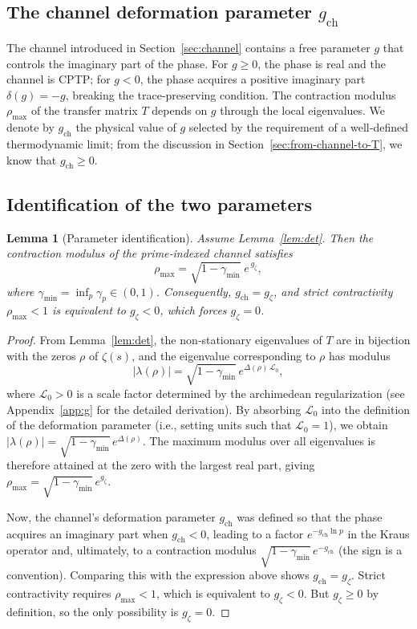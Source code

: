 \documentclass[11pt,a4paper]{article}
\newtheorem{lemma}{Lemma}
\begin{document}
\subsection{The channel deformation parameter $g_{\mathrm{ch}}$}
\label{sec:gch}

The channel introduced in Section~\ref{sec:channel} contains a free parameter $g$ that controls the imaginary part of the phase.  For $g\ge0$, the phase is real and the channel is CPTP; for $g<0$, the phase acquires a positive imaginary part $\delta(g)=-g$, breaking the trace‑preserving condition.  The contraction modulus $\rho_{\max}$ of the transfer matrix $T$ depends on $g$ through the local eigenvalues.  We denote by $g_{\mathrm{ch}}$ the physical value of $g$ selected by the requirement of a well‑defined thermodynamic limit; from the discussion in Section~\ref{sec:from-channel-to-T}, we know that $g_{\mathrm{ch}}\ge0$.

\subsection{Identification of the two parameters}
\label{sec:identification}

\begin{lemma}[Parameter identification]\label{lem:g}
Assume Lemma~\ref{lem:det}.  Then the contraction modulus of the prime‑indexed channel satisfies
\[
\rho_{\max} = \sqrt{1-\gamma_{\min}}\; e^{\,g_{\zeta}},
\]
where $\gamma_{\min} = \inf_{p} \gamma_p \in (0,1)$.  Consequently, $g_{\mathrm{ch}} = g_{\zeta}$, and strict contractivity $\rho_{\max}<1$ is equivalent to $g_{\zeta} < 0$, which forces $g_{\zeta}=0$.
\end{lemma}

\begin{proof}
From Lemma~\ref{lem:det}, the non‑stationary eigenvalues of $T$ are in bijection with the zeros $\rho$ of $\zeta(s)$, and the eigenvalue corresponding to $\rho$ has modulus
\[
|\lambda(\rho)| = \sqrt{1-\gamma_{\min}}\, e^{\Delta(\rho)\,\mathcal{L}_0},
\]
where $\mathcal{L}_0>0$ is a scale factor determined by the archimedean regularization (see Appendix~\ref{app:g} for the detailed derivation).  By absorbing $\mathcal{L}_0$ into the definition of the deformation parameter (i.e., setting units such that $\mathcal{L}_0=1$), we obtain $|\lambda(\rho)| = \sqrt{1-\gamma_{\min}}\, e^{\Delta(\rho)}$.  The maximum modulus over all eigenvalues is therefore attained at the zero with the largest real part, giving $\rho_{\max} = \sqrt{1-\gamma_{\min}}\, e^{g_{\zeta}}$.

Now, the channel's deformation parameter $g_{\mathrm{ch}}$ was defined so that the phase acquires an imaginary part when $g_{\mathrm{ch}}<0$, leading to a factor $e^{-g_{\mathrm{ch}}\ln p}$ in the Kraus operator and, ultimately, to a contraction modulus $\sqrt{1-\gamma_{\min}}\, e^{-g_{\mathrm{ch}}}$ (the sign is a convention).  Comparing this with the expression above shows $g_{\mathrm{ch}} = g_{\zeta}$.  Strict contractivity requires $\rho_{\max}<1$, which is equivalent to $g_{\zeta} < 0$.  But $g_{\zeta} \ge 0$ by definition, so the only possibility is $g_{\zeta}=0$.
\end{proof}
\end{document}
